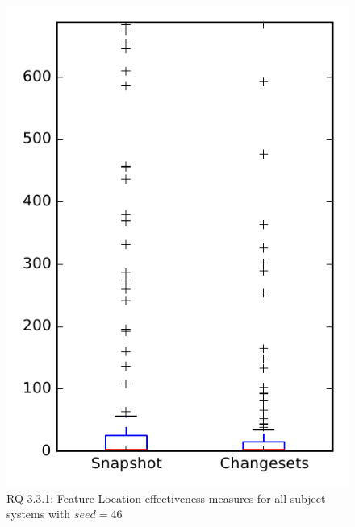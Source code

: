 
\begin{figure}
\centering
\includegraphics[height=0.4\textheight]{figures/flt_seed/rq1_overview_46}
\caption{RQ 3.3.1: Feature Location effectiveness measures for all subject systems with $seed=46$}
\label{fig:flt_seed:rq1:overview}
\end{figure}

